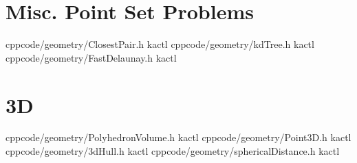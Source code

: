 \section{Misc. Point Set Problems}
    {}{}
    {cpp}{code/geometry/ClosestPair.h}
    {kactl}
    {}{}
    {cpp}{code/geometry/kdTree.h}
    {kactl}
    {}{}
    {cpp}{code/geometry/FastDelaunay.h}
    {kactl}

\section{3D}
    {}{}
    {cpp}{code/geometry/PolyhedronVolume.h}
    {kactl}
    {}{}
    {cpp}{code/geometry/Point3D.h}
    {kactl}
    {}{}
    {cpp}{code/geometry/3dHull.h}
    {kactl}
    {}{}
    {cpp}{code/geometry/sphericalDistance.h}
    {kactl}

